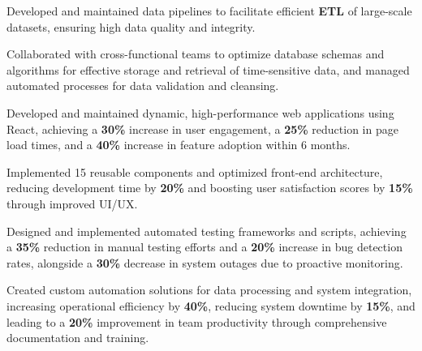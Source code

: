 \documentclass[]{farhan-resume-openfont}
\begin{document}
\begin{minipage}[t]{0.70\textwidth}
    \begin{tightemize}
        \item Developed and maintained data pipelines to facilitate efficient \textbf{ETL} of
        large-scale datasets, ensuring high data quality and integrity.
        \item Collaborated with cross-functional teams to optimize database schemas and
        algorithms for effective storage and retrieval of time-sensitive data, and
        managed automated processes for data validation and cleansing.
    \end{tightemize}
    \sectionsep

    \begin{tightemize}
        \item Developed and maintained dynamic, high-performance web applications using
        React, achieving a \textbf{30\%} increase in user engagement, a \textbf{25\%}
            reduction in page load times, and a \textbf{40\%} increase in feature adoption
        within 6 months.
        \item Implemented 15 reusable components and optimized front-end architecture,
        reducing development time by \textbf{20\%} and boosting user satisfaction
        scores by \textbf{15\%} through improved UI/UX.
    \end{tightemize}
    \sectionsep

    \begin{tightemize}
        \item Designed and implemented automated testing frameworks and scripts, achieving a
        \textbf{35\%} reduction in manual testing efforts and a \textbf{20\%} increase
            in bug detection rates, alongside a \textbf{30\%} decrease in system outages
        due to proactive monitoring.
        \item Created custom automation solutions for data processing and system integration,
        increasing operational efficiency by \textbf{40\%}, reducing system downtime by
        \textbf{15\%}, and leading to a \textbf{20\%} improvement in team productivity
        through comprehensive documentation and training.
    \end{tightemize}

\end{minipage}
\end{document}
